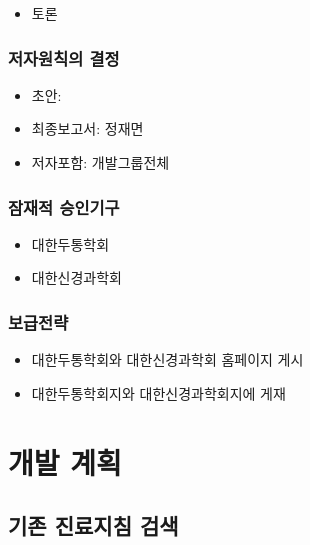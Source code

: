 \documentclass[]{book}
\providecommand{\tightlist}{%
  \setlength{\itemsep}{0pt}\setlength{\parskip}{0pt}}
\begin{document}
\begin{itemize}
\tightlist
\item
  토론
\end{itemize}

\hypertarget{section-13}{%
\subsection{저자원칙의 결정}\label{section-13}}

\begin{itemize}
\tightlist
\item
  초안:
\item
  최종보고서: 정재면
\item
  저자포함: 개발그룹전체
\end{itemize}

\hypertarget{section-14}{%
\subsection{잠재적 승인기구}\label{section-14}}

\begin{itemize}
\tightlist
\item
  대한두통학회
\item
  대한신경과학회
\end{itemize}

\hypertarget{section-15}{%
\subsection{보급전략}\label{section-15}}

\begin{itemize}
\tightlist
\item
  대한두통학회와 대한신경과학회 홈페이지 게시
\item
  대한두통학회지와 대한신경과학회지에 게재
\end{itemize}

\hypertarget{section-16}{%
\chapter{개발 계획}\label{section-16}}

\hypertarget{section-17}{%
\section{기존 진료지침 검색}\label{section-17}}
\end{document}
